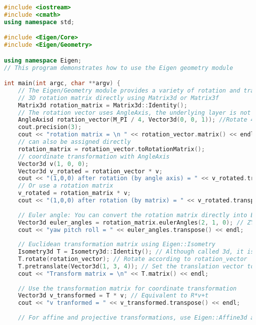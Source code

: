\begin{lstlisting}[language=c++,caption=slambook2/ch3/useGeometry/useGeometry.cpp]
#include <iostream>
#include <cmath>
using namespace std;

#include <Eigen/Core>
#include <Eigen/Geometry>

using namespace Eigen;
// This program demonstrates how to use the Eigen geometry module

int main(int argc, char **argv) {
	// The Eigen/Geometry module provides a variety of rotation and translation representations
	// 3D rotation matrix directly using Matrix3d or Matrix3f
	Matrix3d rotation_matrix = Matrix3d::Identity();
	// The rotation vector uses AngleAxis, the underlying layer is not directly Matrix, but the operation can be treated as a matrix (because the operator is overloaded)
	AngleAxisd rotation_vector(M_PI / 4, Vector3d(0, 0, 1)); //Rotate 45 degrees along the Z axis
	cout.precision(3);
	cout << "rotation matrix = \n " << rotation_vector.matrix() << endl; //convert to matrix with matrix()
	// can also be assigned directly
	rotation_matrix = rotation_vector.toRotationMatrix();
	// coordinate transformation with AngleAxis
	Vector3d v(1, 0, 0);
	Vector3d v_rotated = rotation_vector * v;
	cout << "(1,0,0) after rotation (by angle axis) = " << v_rotated.transpose() << endl;
	// Or use a rotation matrix
	v_rotated = rotation_matrix * v;
	cout << "(1,0,0) after rotation (by matrix) = " << v_rotated.transpose() << endl;
	
	// Euler angle: You can convert the rotation matrix directly into Euler angles
	Vector3d euler_angles = rotation_matrix.eulerAngles(2, 1, 0); // ZYX order, ie roll pitch yaw order
	cout << "yaw pitch roll = " << euler_angles.transpose() << endl;
	
	// Euclidean transformation matrix using Eigen::Isometry
	Isometry3d T = Isometry3d::Identity(); // Although called 3d, it is essentially a 4*4 matrix
	T.rotate(rotation_vector); // Rotate according to rotation_vector
	T.pretranslate(Vector3d(1, 3, 4)); // Set the translation vector to (1,3,4)
	cout << "Transform matrix = \n" << T.matrix() << endl;
	
	// Use the transformation matrix for coordinate transformation
	Vector3d v_transformed = T * v; // Equivalent to R*v+t
	cout << "v tranformed = " << v_transformed.transpose() << endl;
	
	// For affine and projective transformations, use Eigen::Affine3d and Eigen::Projective3d.
	

\end{lstlisting}
